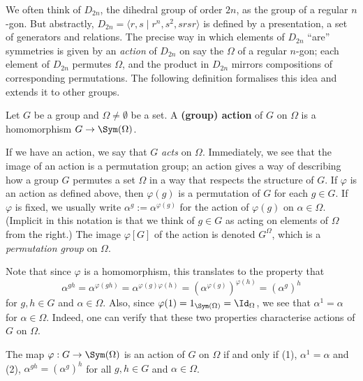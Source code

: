 
We often think of $D_{2n}$, the dihedral group of order $2n$, as the  group of a regular $n$-gon. But abstractly, \mbox{$D_{2n} = \langle r,s \mid r^n,s^2,srsr \rangle$} is defined by a presentation, a set of generators and relations. The precise way in which elements of $D_{2n}$ ``are'' symmetries is given by an \textit{action} of $D_{2n}$ on say the  $\Omega$ of a regular $n$-gon; each element of $D_{2n}$ permutes $\Omega$, and the product in $D_{2n}$ mirrors compositions of corresponding permutations. The following definition formalises this idea and extends it to other groups.

\begin{definition}\label{def:action}
    Let $G$ be a group and $\Omega \neq \emptyset$ be a set. A \textbf{(group) action} of $G$ on $\Omega$ is a homomorphism $G \to \Sym(\Omega)$. 
\end{definition}

If we have an action, we say that $G$ \textit{acts} on $\Omega$. Immediately, we see that the image of an action is a permutation group; an action gives a way of describing how a group $G$ permutes a set $\Omega$ in a way that respects the structure of $G$. If $\varphi$ is an action as defined above, then $\varphi(g)$ is a permutation of $G$ for each $g \in G$. If $\varphi$ is fixed, we usually write $\alpha^g := \alpha^{\varphi(g)}$ for the action of $\varphi(g)$ on $\alpha \in \Omega$. (Implicit in this notation is that we think of $g \in G$ as acting on elements of $\Omega$ from the right.) The image $\varphi[G]$ of the action is denoted $G^\Omega$, which is a \textit{permutation group} on $\Omega$. 

Note that since $\varphi$ is a homomorphism, this translates to the property that
$$\alpha^{gh} = \alpha^{\varphi(gh)} = \alpha^{\varphi(g)\varphi(h)} = (\alpha^{\varphi(g)})^{\varphi(h)} = (\alpha^g)^h$$
for $g,h \in G$ and $\alpha \in \Omega$. Also, since $\varphi(1) = 1_{\Sym(\Omega)} = \Id_\Omega$, we see that $\alpha^1 = \alpha$ for $\alpha \in \Omega$. Indeed, one can verify that these two properties characterise actions of $G$ on $\Omega$.

\begin{lemma}\label{lem:verify_action}
    The map $\varphi : G \to \Sym(\Omega)$ is an action of $G$ on $\Omega$ if and only if (1), $\alpha^1 = \alpha$ and (2), $\alpha^{gh} = (\alpha^g)^h$ for all $g,h \in G$ and $\alpha \in \Omega$.  \qedhere
\end{lemma}

